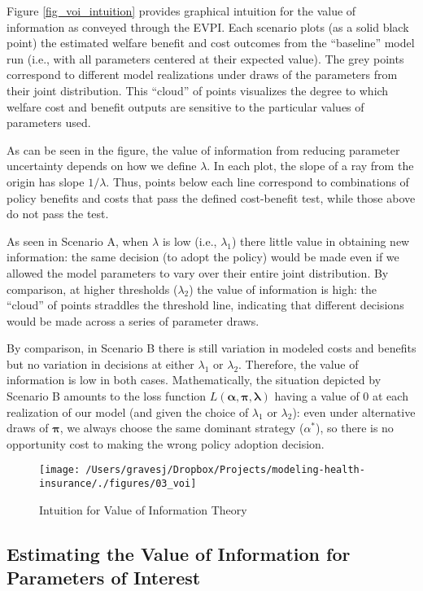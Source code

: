 \documentclass[
  10pt,
]{article}
\begin{document}
Figure \ref{fig_voi_intuition} provides graphical intuition for the
value of information as conveyed through the EVPI. Each scenario plots
(as a solid black point) the estimated welfare benefit and cost outcomes
from the ``baseline'' model run (i.e., with all parameters centered at
their expected value). The grey points correspond to different model
realizations under draws of the parameters from their joint
distribution. This ``cloud'' of points visualizes the degree to which
welfare cost and benefit outputs are sensitive to the particular values
of parameters used.

As can be seen in the figure, the value of information from reducing
parameter uncertainty depends on how we define \(\lambda\). In each
plot, the slope of a ray from the origin has slope \(1/\lambda\). Thus,
points below each line correspond to combinations of policy benefits and
costs that pass the defined cost-benefit test, while those above do not
pass the test.

As seen in Scenario A, when \(\lambda\) is low (i.e., \(\lambda_1\))
there little value in obtaining new information: the same decision (to
adopt the policy) would be made even if we allowed the model parameters
to vary over their entire joint distribution. By comparison, at higher
thresholds (\(\lambda_2\)) the value of information is high: the
``cloud'' of points straddles the threshold line, indicating that
different decisions would be made across a series of parameter draws.

By comparison, in Scenario B there is still variation in modeled costs
and benefits but no variation in decisions at either \(\lambda_1\) or
\(\lambda_2\). Therefore, the value of information is low in both cases.
Mathematically, the situation depicted by Scenario B amounts to the loss
function \(L(\boldsymbol{\alpha, \pi,\lambda})\) having a value of 0 at
each realization of our model (and given the choice of \(\lambda_1\) or
\(\lambda_2\)): even under alternative draws of \(\boldsymbol{\pi}\), we
always choose the same dominant strategy (\(\alpha^*\)), so there is no
opportunity cost to making the wrong policy adoption decision.

\begin{figure}
\texttt{[image: /Users/gravesj/Dropbox/Projects/modeling-health-insurance/./figures/03\_voi]} \caption{\label{fig_voi_intuition}Intuition for Value of Information Theory}\label{fig:unnamed-chunk-1}
\end{figure}

\hypertarget{estimating-the-value-of-information-for-parameters-of-interest}{%
\subsection{Estimating the Value of Information for Parameters of
Interest}\label{estimating-the-value-of-information-for-parameters-of-interest}}
\end{document}
